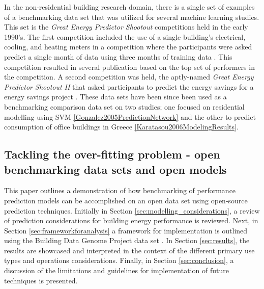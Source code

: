 \documentclass[preprint,12pt]{elsarticle}
\begin{document}
In the non-residential building research domain, there is a single set of examples of a benchmarking data set that was utilized for several machine learning studies. This set is the \emph{Great Energy Predictor Shootout} competitions held in the early 1990's. The first competition included the use of a single building's electrical, cooling, and heating meters in a competition where the participants were asked predict a single month of data using three months of training data \cite{osti_33315}. This competition resulted in several publication based on the top set of performers in the competition. A second competition was held, the aptly-named \emph{Great Energy Predictor Shootout II} that asked participants to predict the energy savings for a energy savings project \cite{haberl1996great}. These data sets have been since been used as a benchmarking comparison data set on two studies; one focused on residential modelling using SVM \ref{Gonzalez2005PredictionNetwork} and the other to predict consumption of office buildings in Greece \ref{Karatasou2006ModelingResults}.

\subsection{Tackling the over-fitting problem - open benchmarking data sets and open models}
\label{sec:outline}

This paper outlines a demonstration of how benchmarking of performance prediction models can be accomplished on an open data set using open-source prediction techniques. Initially in Section \ref{sec:modelling_considerations}, a review of prediction considerations for building energy performance is reviewed. Next, in Section \ref{sec:frameworkforanalysis} a framework for implementation is outlined using the Building Data Genome Project data set . In Section \ref{sec:results}, the results are showcased and interpreted in the context of the different primary use types and operations considerations. Finally, in Section \ref{sec:conclusion}, a discussion of the limitations and guidelines for implementation of future techniques is presented.
 
\end{document}
